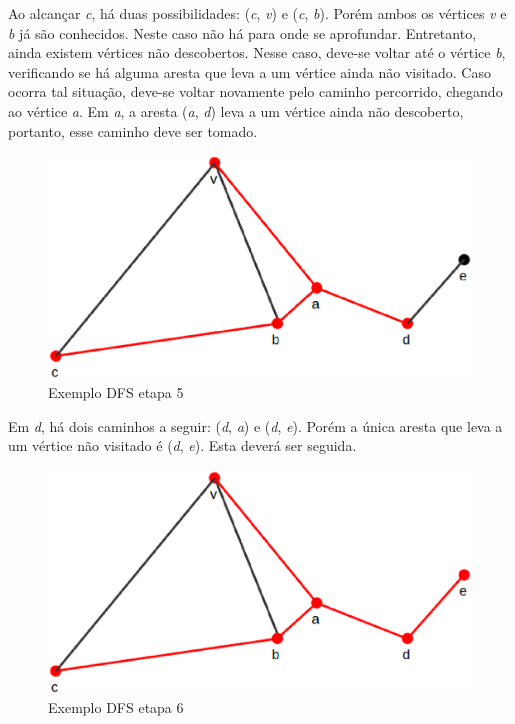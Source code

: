 Ao alcançar \textit{c}, há duas possibilidades: (\textit{c}, \textit{v}) e (\textit{c}, \textit{b}). Porém ambos os vértices \textit{v} e \textit{b} já são conhecidos. Neste caso não há para onde se aprofundar. Entretanto, ainda existem vértices não descobertos. Nesse caso, deve-se voltar até o vértice \textit{b}, verificando se há alguma aresta que leva a um vértice ainda não visitado. Caso ocorra tal situação, deve-se voltar novamente pelo caminho percorrido, chegando ao vértice \textit{a}. Em \textit{a}, a aresta (\textit{a}, \textit{d}) leva a um vértice ainda não descoberto, portanto, esse caminho deve ser tomado.

\begin{figure}[!h]
	\centering
	\includegraphics[scale=0.25]{figuras/capitulo2/dfs/dfs5.eps}
	\caption[Exemplo DFS etapa 5]{Exemplo DFS etapa 5 \cite{Cormen:2001}}
	\label{dfs5}
\end{figure}

Em \textit{d}, há dois caminhos a seguir: (\textit{d}, \textit{a}) e (\textit{d}, \textit{e}). Porém a única aresta que leva a um vértice não visitado é (\textit{d}, \textit{e}). Esta deverá ser seguida.

\begin{figure}[!h]
	\centering
	\includegraphics[scale=0.25]{figuras/capitulo2/dfs/dfs6.eps}
	\caption[Exemplo DFS etapa 6]{Exemplo DFS etapa 6 \cite{Cormen:2001}}
	\label{dfs6}
\end{figure}

